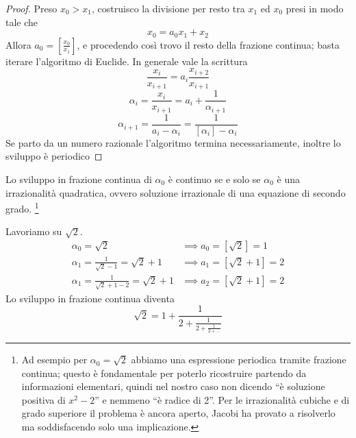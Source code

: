 \begin{proof}
	Preso $x_0>x_1$, costruisco la divisione per resto tra $x_1$ ed $x_0$ presi in modo tale che 
	\begin{equation*}
	x_0=a_0x_1+x_2
	\end{equation*}
	Allora $a_0=\left[\frac{x_0}{x_1}\right]$, e procedendo così trovo il resto della frazione continua; basta iterare l'algoritmo di Euclide. In generale vale la scrittura 
	\begin{equation*}
	\frac{x_{i}}{x_{i+1}}=a_i\frac{x_{i+2}}{x_{i+1}}
	\end{equation*}
	\begin{equation*}
	\alpha_i=\frac{x_{i}}{x_{i+1}}=a_i+\frac{1}{\alpha_{i+1}}
	\end{equation*}
	\begin{equation*}
	\alpha_{i+1}=\frac{1}{a_i-\alpha_i}=\frac{1}{\left[\alpha_i\right]-\alpha_i}
	\end{equation*}
	Se parto da un numero razionale l'algoritmo termina necessariamente, inoltre lo sviluppo è periodico 
\end{proof}
\begin{proposizione}
	Lo sviluppo in frazione continua di $\alpha_0$ è continuo se e solo se $\alpha_0$ è una irrazionalità quadratica, ovvero soluzione irrazionale di una equazione di secondo grado. \footnote{Ad esempio per $\alpha_0=\sqrt{2}$ abbiamo una espressione periodica tramite frazione continua; questo è fondamentale per poterlo ricostruire partendo da informazioni elementari, quindi nel nostro caso non dicendo \enquote{è soluzione positiva di $x^2-2$} e nemmeno \enquote{è radice di 2}. Per le irrazionalità cubiche e di grado superiore il problema è ancora aperto, Jacobi ha provato a risolverlo ma soddisfacendo solo una implicazione.}
\end{proposizione}
\begin{esempio}
	Lavoriamo su $\sqrt{2}$.
	\begin{align*}
	\alpha_0=\sqrt{2}&\implies a_0=\left[\sqrt{2}\right]=1\\
	\alpha_1=\frac{1}{\sqrt{2}-1}=\sqrt{2}+1&\implies a_1=\left[\sqrt{2}+1\right]=2\\
	\alpha_1=\frac{1}{\sqrt{2}+1-2}=\sqrt{2}+1&\implies a_2=\left[\sqrt{2}+1\right]=2
	\end{align*}
	Lo sviluppo in frazione continua diventa 
	\begin{equation*}
	\sqrt{2}=1+\frac{1}{2+\frac{1}{2+\frac{1}{2+\dots}}}
	\end{equation*}
\end{esempio}
